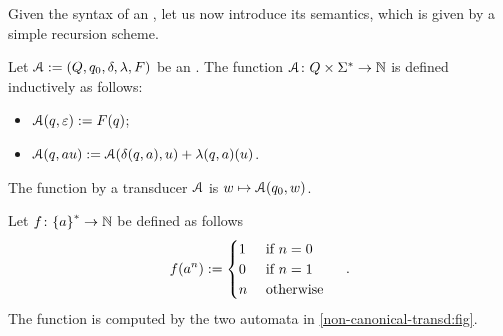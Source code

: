 Given the syntax of an , let us now 
introduce its semantics, which is given by a simple recursion
scheme.
\begin{definition}
    Let $\mathcal{A} \mathrel{:=} (Q,q_0, \delta, \lambda, F)$ be an .
    The function
    $\mathcal{A} \colon Q \times \Sigma^* \to \mathbb{N}$
    is defined inductively  as follows:
    \begin{itemize}
        \item $\mathcal{A}(q, \varepsilon) \mathrel{:=} F(q)$;
        \item $\mathcal{A}(q, a u) \mathrel{:=} \mathcal{A}(\delta(q,a), u)
            + \lambda(q,a)(u)$.
    \end{itemize}
    The function  by a transducer $\mathcal{A}$
    is $w \mapsto \mathcal{A}(q_0, w)$.
\end{definition}


\begin{example}
    \label{non-canonical-transd:ex}
    Let $f \colon \mathopen{\{} a \mathclose{\}}^* \to \mathbb{N}$
    be defined as follows
    \begin{equation*}
        f(a^n) \mathrel{:=}
        \begin{cases}
            1 & \text{ if } n = 0 \\
            0 & \text{ if } n = 1 \\
            n & \text{ otherwise }
        \end{cases}
        \quad .
    \end{equation*}
    The function is computed by the two automata
    in \cref{non-canonical-transd:fig}.
\end{example}

